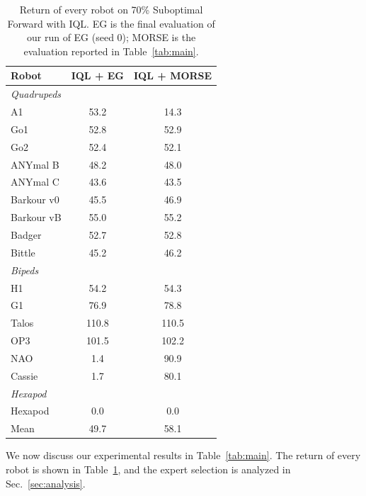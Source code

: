 \begin{table}[t]
\centering
\footnotesize
\caption{Return of every robot on 70\% Suboptimal Forward with IQL. EG is the final evaluation of our run of EG
(seed 0); MORSE is the evaluation reported in Table~\ref{tab:main}.}
\label{tab:robots}
\begin{tabular}{l>{\columncolor{egbg}}c>{\columncolor{ourbg}}c}
\toprule
Robot & IQL + EG & IQL + MORSE \\
\midrule
\multicolumn{3}{l}{\textit{Quadrupeds}} \\
A1 & 53.2 & 14.3 \\
Go1 & 52.8 & 52.9 \\
Go2 & 52.4 & 52.1 \\
ANYmal B & 48.2 & 48.0 \\
ANYmal C & 43.6 & 43.5 \\
Barkour v0 & 45.5 & 46.9 \\
Barkour vB & 55.0 & 55.2 \\
Badger & 52.7 & 52.8 \\
Bittle & 45.2 & 46.2 \\
\multicolumn{3}{l}{\textit{Bipeds}} \\
H1 & 54.2 & 54.3 \\
G1 & 76.9 & 78.8 \\
Talos & 110.8 & 110.5 \\
OP3 & 101.5 & 102.2 \\
NAO & 1.4 & 90.9 \\
Cassie & 1.7 & 80.1 \\
\multicolumn{3}{l}{\textit{Hexapod}} \\
Hexapod & 0.0 & 0.0 \\
\midrule
Mean & 49.7 & 58.1 \\
\bottomrule
\end{tabular}
\end{table}

We now discuss our experimental results in Table~\ref{tab:main}. The return of every robot is shown in
Table~\ref{tab:robots}, and the expert selection is analyzed in Sec.~\ref{sec:analysis}.

